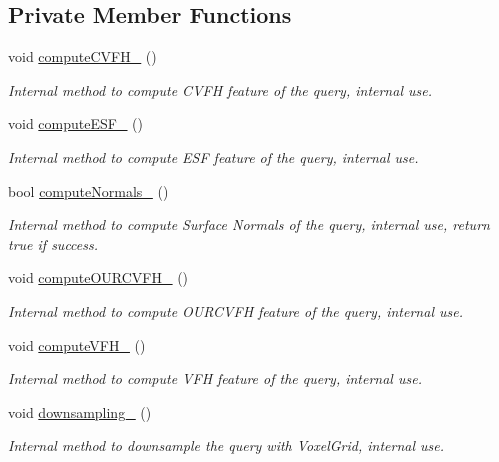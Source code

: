 \subsection*{Private Member Functions}
\begin{DoxyCompactItemize}
\item 
void \hyperlink{classPoseEstimation_aec68d8103e751c230fc8a6d8ea07c09f}{compute\-C\-V\-F\-H\-\_\-} ()
\begin{DoxyCompactList}\small\item\em Internal method to compute C\-V\-F\-H feature of the query, internal use. \end{DoxyCompactList}\item 
void \hyperlink{classPoseEstimation_a5609c5fbccc84d66bc9a8aa5da68aacc}{compute\-E\-S\-F\-\_\-} ()
\begin{DoxyCompactList}\small\item\em Internal method to compute E\-S\-F feature of the query, internal use. \end{DoxyCompactList}\item 
bool \hyperlink{classPoseEstimation_aa1a41fbd7d064d12cf220fb6007d4254}{compute\-Normals\-\_\-} ()
\begin{DoxyCompactList}\small\item\em Internal method to compute Surface Normals of the query, internal use, return true if success. \end{DoxyCompactList}\item 
void \hyperlink{classPoseEstimation_aac99373a768dd39a4c3d93485d955f04}{compute\-O\-U\-R\-C\-V\-F\-H\-\_\-} ()
\begin{DoxyCompactList}\small\item\em Internal method to compute O\-U\-R\-C\-V\-F\-H feature of the query, internal use. \end{DoxyCompactList}\item 
void \hyperlink{classPoseEstimation_a8fc876c0ec4398c415b202897d050221}{compute\-V\-F\-H\-\_\-} ()
\begin{DoxyCompactList}\small\item\em Internal method to compute V\-F\-H feature of the query, internal use. \end{DoxyCompactList}\item 
void \hyperlink{classPoseEstimation_a62b07e83b4f4e4dc531cb53b53d6722e}{downsampling\-\_\-} ()
\begin{DoxyCompactList}\small\item\em Internal method to downsample the query with Voxel\-Grid, internal use. \end{DoxyCompactList}\item 

\end{DoxyCompactItemize}
